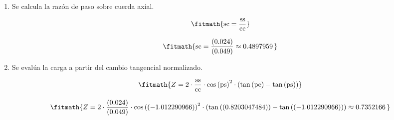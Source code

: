 \begin{enumerate}

\item Se calcula la razón de paso sobre cuerda axial.

\[\fitmath{\mathrm{sc}=\frac{\mathrm{ss}}{\mathrm{cc}}}\]

\[\fitmath{\mathrm{sc}=\frac{(0.024)}{(0.049)}\approx 0.4897959\,}\]

\item Se evalúa la carga a partir del cambio tangencial normalizado.

\[\fitmath{Z=2\cdot \frac{\mathrm{ss}}{\mathrm{cc}}\cdot {\cos\left(\mathrm{ps}\right)}^{2}\cdot \left(\tan\left(\mathrm{pe}\right)-\tan\left(\mathrm{ps}\right)\right)}\]

\[\fitmath{Z=2\cdot \frac{(0.024)}{(0.049)}\cdot {\cos\left((-1.012290966)\right)}^{2}\cdot \left(\tan\left((0.8203047484)\right)-\tan\left((-1.012290966)\right)\right)\approx 0.7352166\,}\]

\end{enumerate}
